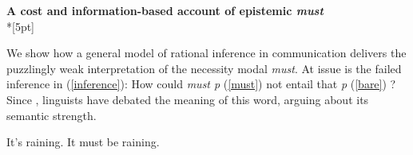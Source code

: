 \documentclass[11pt]{article}
\begin{document}
\begin{center}\textbf{A cost and information-based account of epistemic \textit{must}}\\*[5pt]
\end{center}

\vspace{-11pt}


We show how a general model of rational inference in communication delivers the puzzlingly weak interpretation of the necessity modal \emph{must}. At issue is the failed inference in (\ref{inference}): How could \emph{must p} (\ref{must}) not entail that \emph{p} (\ref{bare})
? Since \citealt{karttunen1972}, linguists have debated the meaning of this word, arguing about its semantic strength.

\vspace{-8pt}
\begin{exe}
\ex\label{inference} 
\begin{xlist}
\ex\label{bare}  It's raining.
\ex\label{must} It must be raining.
\end{xlist}
\end{exe}
\vspace{-8pt}
\end{document}
